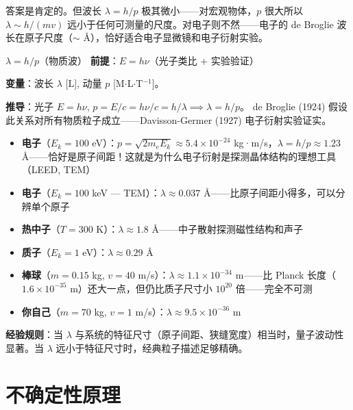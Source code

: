 答案是肯定的。但波长 $\lambda = h/p$ 极其微小——对宏观物体，$p$ 很大所以 $\lambda \sim h/(mv)$ 远小于任何可测量的尺度。对电子则不然——电子的 de Broglie 波长在原子尺度（$\sim$ \AA{}），恰好适合电子显微镜和电子衍射实验。


\begin{lawbox}[de Broglie 波长]
  $\lambda = h/p$（物质波）
  \quad\textbf{前提}：$E = h\nu$（光子类比 + 实验验证）
\end{lawbox}

\noindent\textbf{变量}：波长 $\lambda$ [L], 动量 $p$ [M$\cdot$L$\cdot$T$^{-1}$]。

\textbf{推导}：光子 $E = h\nu$, $p = E/c = h\nu/c = h/\lambda \implies \lambda = h/p$。
de Broglie (1924) 假设此关系对所有物质粒子成立——Davisson-Germer (1927) 电子衍射实验证实。

\begin{oombox}
  \begin{itemize}
    \item \textbf{电子}（$E_k=100$ eV）：$p=\sqrt{2m_eE_k} \approx 5.4\times10^{-24}$ kg·m/s，$\lambda = h/p \approx 1.23$ \AA{}——恰好是原子间距！这就是为什么电子衍射是探测晶体结构的理想工具（LEED, TEM）
    \item \textbf{电子}（$E_k=100$ keV — TEM）：$\lambda \approx 0.037$ \AA{}——比原子间距小得多，可以分辨单个原子
    \item \textbf{热中子}（$T=300$ K）：$\lambda \approx 1.8$ \AA{}——中子散射探测磁性结构和声子
    \item \textbf{质子}（$E_k=1$ eV）：$\lambda \approx 0.29$ \AA{}
    \item \textbf{棒球}（$m=0.15$ kg, $v=40$ m/s）：$\lambda \approx 1.1\times10^{-34}$ m——比 Planck 长度（$1.6\times10^{-35}$ m）还大一点，但仍比质子尺寸小 $10^{20}$ 倍——完全不可测
    \item \textbf{你自己}（$m=70$ kg, $v=1$ m/s）：$\lambda \approx 9.5\times10^{-36}$ m
  \end{itemize}
  \textbf{经验规则}：当 $\lambda$ 与系统的特征尺寸（原子间距、狭缝宽度）相当时，量子波动性显著。当 $\lambda$ 远小于特征尺寸时，经典粒子描述足够精确。
\end{oombox}

\section{不确定性原理}

